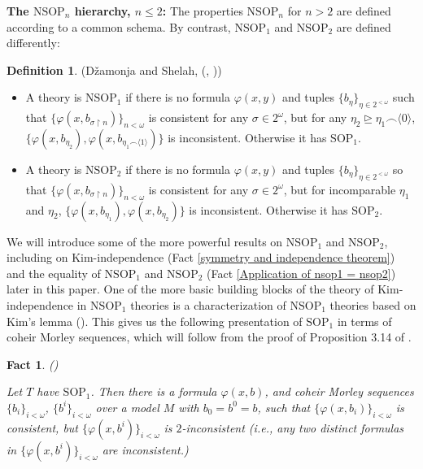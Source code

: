 \documentclass{amsart}
\newtheorem{fact}[theorem]{Fact}
\theoremstyle{definition}
\newtheorem{definition}[theorem]{Definition}
\theoremstyle{remark}
\numberwithin{equation}{section}
\begin{document}
\textbf{The $\mathrm{NSOP}_{n}$ hierarchy, $n \leq 2$:} The properties $\mathrm{NSOP}_{n}$ for $n > 2$ are defined according to a common schema. By contrast, $\mathrm{NSOP}_{1}$ and $\mathrm{NSOP}_{2}$ are defined differently:

\begin{definition}\label{nsop1 definition and nsop2 definition}(Džamonja and Shelah, (\cite{Sh99},  \cite{DS04}))

\begin{itemize}
    \item A theory is $\mathrm{NSOP}_{1}$ if there is no formula $\varphi(x, y)$ and tuples $\{b_{\eta}\}_{\eta \in 2^{<\omega}}$ such that $\{\varphi(x, b_{\sigma \upharpoonright n})\}_{n < \omega}$ is consistent for any $\sigma \in 2^{\omega}$, but for any $\eta_{2} \unrhd \eta_{1} \smallfrown \langle 0\rangle$, $\{\varphi(x, b_{\eta_{2}}), \varphi(x, b_{\eta_{1} \smallfrown \langle 1\rangle})\}$ is inconsistent. Otherwise it has $\mathrm{SOP}_{1}$.

    \item A theory is $\mathrm{NSOP}_{2}$ if there is no formula $\varphi(x, y)$ and tuples $\{b_{\eta}\}_{\eta \in 2^{<\omega}}$ so that $\{\varphi(x, b_{\sigma \upharpoonright n})\}_{n < \omega}$ is consistent for any $\sigma \in 2^{\omega}$, but for incomparable $\eta_{1}$ and $\eta_{2}$, $\{\varphi(x, b_{\eta_{1}}), \varphi(x, b_{\eta_{2}})\}$ is inconsistent. Otherwise it has $\mathrm{SOP}_{2}$.
\end{itemize}

\end{definition}

We will introduce some of the more powerful results on $\mathrm{NSOP}_{1}$ and $\mathrm{NSOP}_{2}$, including on Kim-independence (Fact \ref{symmetry and independence theorem}) and the equality of $\mathrm{NSOP}_{1}$ and $\mathrm{NSOP}_{2}$ (Fact \ref{Application of nsop1 = nsop2}) later in this paper. One of the more basic building blocks of the theory of Kim-independence in $\mathrm{NSOP}_{1}$ theories is a characterization of $\mathrm{NSOP}_{1}$ theories based on Kim's lemma (\cite{KR17}). This gives us the following presentation of $\mathrm{SOP}_{1}$ in terms of coheir Morley sequences, which will follow from the proof of Proposition 3.14 of \cite{KR17}. 

\begin{fact}\label{sop1 coheirs}(\cite{KR17})

Let $T$ have $\mathrm{SOP}_{1}$. Then there is a formula $\varphi(x, b)$, and coheir Morley sequences $\{b_{i}\}_{i< \omega}$, $\{b^{i}\}_{i< \omega}$ over a model $M$ 
with $b_{0} = b^{0}= b$, such that $\{\varphi(x, b_i)\}_{i < \omega}$ is consistent, but $\{\varphi(x, b^i)\}_{i < \omega}$ is $2$-inconsistent (i.e., any two distinct formulas in $\{\varphi(x, b^i)\}_{i < \omega}$ are inconsistent.)




    
\end{fact}
\end{document}
